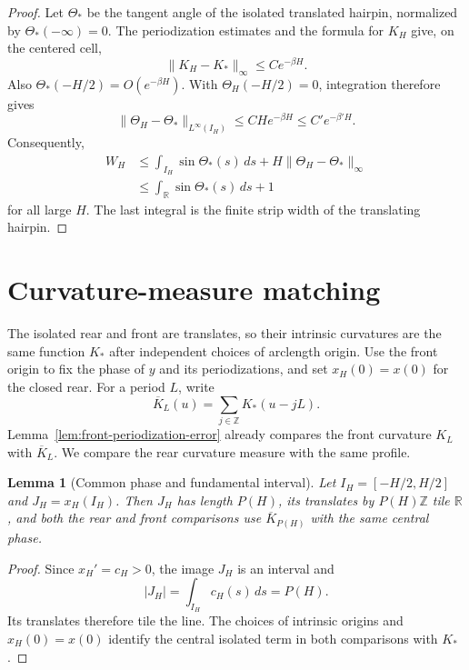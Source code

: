 \documentclass[11pt]{article}
\newtheorem{lemma}[theorem]{Lemma}
\theoremstyle{remark}
\newcommand{\R}{\mathbb R}
\begin{document}
\begin{proof}
Let \(\Theta_*\) be the tangent angle of the isolated translated hairpin,
normalized by \(\Theta_*(-\infty)=0\).  The periodization estimates and the
formula for \(K_H\) give, on the centered cell,
\[
   \|K_H-K_*\|_\infty\leq Ce^{-\beta H}.
\]
Also \(\Theta_*(-H/2)=O(e^{-\beta H})\).  With
\(\Theta_H(-H/2)=0\), integration therefore gives
\[
   \|\Theta_H-\Theta_*\|_{L^\infty(I_H)}
      \leq CH e^{-\beta H}
      \leq C'e^{-\beta'H}.
\]
Consequently,
\[
\begin{aligned}
   W_H
   &\leq\int_{I_H}\sin\Theta_*(s)\,ds
       +H\|\Theta_H-\Theta_*\|_\infty\\
   &\leq\int_\R\sin\Theta_*(s)\,ds+1
\end{aligned}
\]
for all large \(H\).  The last integral is the finite strip width of the
translating hairpin.
\end{proof}

\section{Curvature-measure matching}\label{sec:matching}

The isolated rear and front are translates, so their intrinsic curvatures are
the same function \(K_*\) after independent choices of arclength origin.  Use
the front origin to fix the phase of \(y\) and its periodizations, and set
\(x_H(0)=x(0)\) for the closed rear.  For a period \(L\), write
\[
   \overline K_L(u)=\sum_{j\in\mathbb Z}K_*(u-jL).
\]
Lemma~\ref{lem:front-periodization-error} already compares the front
curvature \(K_L\) with \(\overline K_L\).  We compare the rear curvature
measure with the same profile.

\begin{lemma}[Common phase and fundamental interval]\label{lem:phase-fundamental}
Let \(I_H=[-H/2,H/2]\) and \(J_H=x_H(I_H)\).  Then \(J_H\) has length
\(P(H)\), its translates by \(P(H)\mathbb Z\) tile \(\mathbb R\), and both
the rear and front comparisons use \(\overline K_{P(H)}\) with the same
central phase.
\end{lemma}

\begin{proof}
Since \(x_H'=c_H>0\), the image \(J_H\) is an interval and
\[
 |J_H|=\int_{I_H}c_H(s)\,ds=P(H).
\]
Its translates therefore tile the line.  The choices of intrinsic origins and
\(x_H(0)=x(0)\) identify the central isolated term in both comparisons with
\(K_*\).
\end{proof}
\end{document}

